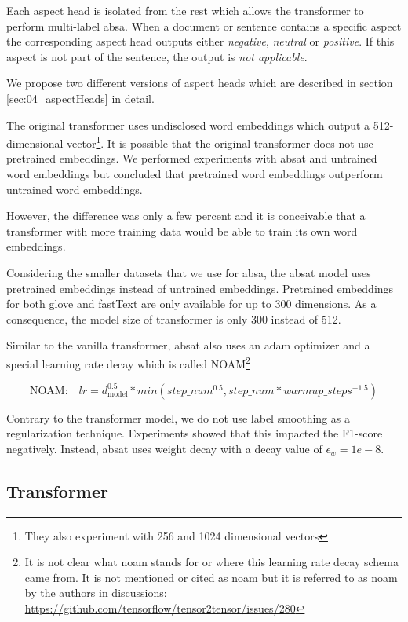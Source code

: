 Each aspect head is isolated from the rest which allows the transformer to perform multi-label \gls{absa}. When a document or sentence contains a specific aspect the corresponding aspect head outputs either \textit{negative}, \textit{neutral} or \textit{positive}. If this aspect is not part of the sentence, the output is \textit{not applicable}.

We propose two different versions of aspect heads which are described in section \ref{sec:04_aspectHeads} in detail.
\bigskip

The original transformer uses undisclosed word embeddings which output a 512-dimensional vector\footnote{They also experiment with 256 and 1024 dimensional vectors}. It is possible that the original transformer does not use pretrained embeddings. We performed experiments with \gls{absat} and untrained word embeddings but concluded that pretrained word embeddings outperform untrained word embeddings. 

However, the difference was only a few percent and it is conceivable that a transformer with more training data would be able to train its own word embeddings.
\medskip

Considering the smaller datasets that we use for \gls{absa}, the \gls{absat} model uses pretrained embeddings instead of untrained embeddings. Pretrained embeddings for both \gls{glove} and fastText are only available for up to 300 dimensions. As a consequence, the model size of transformer is only 300 instead of 512.
\bigskip

Similar to the vanilla transformer, \gls{absat} also uses an \gls{adam} optimizer \cite{Kingma2014} and a special learning rate decay which is called NOAM\footnote{It is not clear what noam stands for or where this learning rate decay schema came from. It is not mentioned or cited as noam but it is referred to as noam by the authors in discussions: \url{https://github.com/tensorflow/tensor2tensor/issues/280}} \cite{Vaswani2017}

\begin{equation}
	\text{NOAM:} \quad lr = d_\text{model}^{0.5} * min(step\_num^{0.5}, step\_num*warmup\_steps^{-1.5})
\end{equation}
 
Contrary to the transformer model, we do not use label smoothing as a regularization technique. Experiments showed that this impacted the F1-score negatively. Instead, \gls{absat} uses weight decay with a decay value of $\epsilon_w = 1e-8$.

\subsection{Transformer}
\label{sec:04_transformer}

